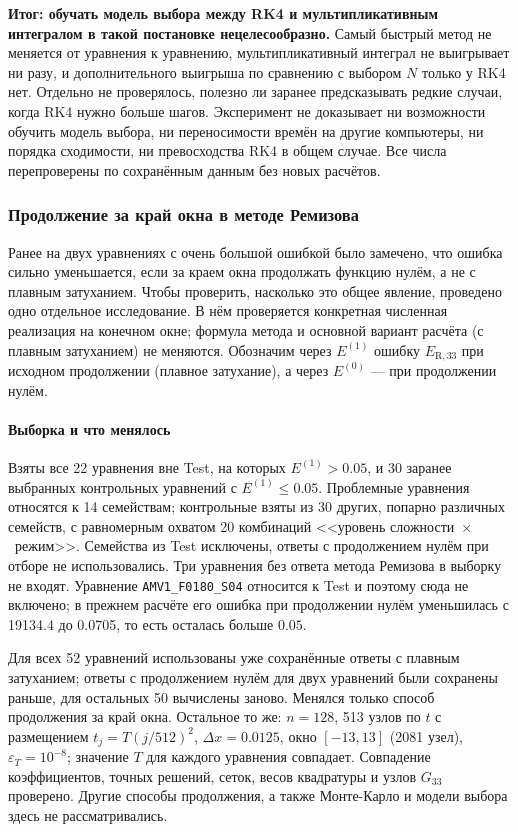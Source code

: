 \documentclass[14pt,a4paper]{extarticle}
\begin{document}
\textbf{Итог: обучать модель выбора между RK4 и мультипликативным
интегралом в такой постановке нецелесообразно.} Самый быстрый метод
не меняется от уравнения к уравнению, мультипликативный интеграл
не выигрывает ни разу, и дополнительного выигрыша по сравнению с выбором
$N$ только у RK4 нет. Отдельно не проверялось, полезно ли заранее
предсказывать редкие случаи, когда RK4 нужно больше шагов. Эксперимент
не доказывает ни возможности обучить модель выбора, ни переносимости
времён на другие компьютеры, ни порядка сходимости, ни превосходства
RK4 в общем случае. Все числа перепроверены по сохранённым данным
без новых расчётов.

\clearpage
\subsubsection{Продолжение за край окна в методе Ремизова}
\label{sec:boundarydev}

Ранее на двух уравнениях с очень большой ошибкой было замечено, что
ошибка сильно уменьшается, если за краем окна продолжать функцию нулём,
а не с плавным затуханием. Чтобы проверить, насколько это общее
явление, проведено одно отдельное исследование. В нём проверяется
конкретная численная реализация на конечном окне; формула метода
и основной вариант расчёта (с плавным затуханием) не меняются.
Обозначим через $E^{(1)}$ ошибку $E_{\mathrm{R},33}$ при исходном
продолжении (плавное затухание), а через $E^{(0)}$ --- при продолжении
нулём.

\paragraph{Выборка и что менялось\\}
Взяты все 22 уравнения вне Test, на которых $E^{(1)}>0.05$,
и 30 заранее выбранных контрольных уравнений с $E^{(1)}\le0.05$.
Проблемные уравнения относятся к 14 семействам; контрольные взяты
из 30 других, попарно различных семейств, с равномерным охватом
20 комбинаций <<уровень сложности~$\times$~режим>>. Семейства из Test
исключены, ответы с продолжением нулём при отборе не использовались.
Три уравнения без ответа метода Ремизова в выборку не входят.
Уравнение \texttt{AMV1\_F0180\_S04} относится к Test и поэтому сюда
не включено; в прежнем расчёте его ошибка при продолжении нулём
уменьшилась с 19134.4 до 0.0705, то есть осталась больше $0.05$.

Для всех 52 уравнений использованы уже сохранённые ответы с плавным
затуханием; ответы с продолжением нулём для двух уравнений были
сохранены раньше, для остальных 50 вычислены заново. Менялся только
способ продолжения за край окна. Остальное то же: $n=128$, 513 узлов
по $t$ с размещением $t_j=T(j/512)^2$, $\Delta x=0.0125$, окно $[-13,13]$
(2081 узел), $\varepsilon_T=10^{-8}$; значение $T$ для каждого уравнения
совпадает. Совпадение коэффициентов, точных решений, сеток, весов
квадратуры и узлов $G_{33}$ проверено. Другие способы продолжения,
а также Монте-Карло и модели выбора здесь не рассматривались.
\end{document}
